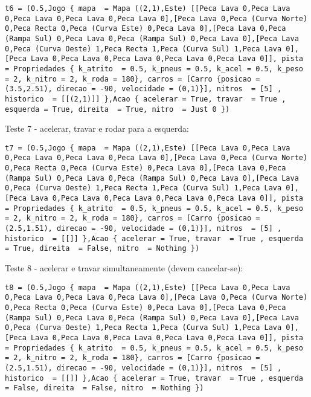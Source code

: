 \documentclass[a4paper]{report}
\begin{document}
\begin{lstlisting}
t6 = (0.5,Jogo { mapa  = Mapa ((2,1),Este) [[Peca Lava 0,Peca Lava 0,Peca Lava 0,Peca Lava 0,Peca Lava 0],[Peca Lava 0,Peca (Curva Norte) 0,Peca Recta 0,Peca (Curva Este) 0,Peca Lava 0],[Peca Lava 0,Peca (Rampa Sul) 0,Peca Lava 0,Peca (Rampa Sul) 0,Peca Lava 0],[Peca Lava 0,Peca (Curva Oeste) 1,Peca Recta 1,Peca (Curva Sul) 1,Peca Lava 0],[Peca Lava 0,Peca Lava 0,Peca Lava 0,Peca Lava 0,Peca Lava 0]], pista = Propriedades { k_atrito  = 0.5, k_pneus = 0.5, k_acel = 0.5, k_peso = 2, k_nitro = 2, k_roda = 180}, carros = [Carro {posicao = (3.5,2.51), direcao = -90, velocidade = (0,1)}], nitros  = [5] , historico  = [[(2,1)]] },Acao { acelerar = True, travar  = True , esquerda = True, direita  = True, nitro  = Just 0 })
\end{lstlisting}

Teste 7 - acelerar, travar e rodar para a esquerda:

\begin{lstlisting}
t7 = (0.5,Jogo { mapa  = Mapa ((2,1),Este) [[Peca Lava 0,Peca Lava 0,Peca Lava 0,Peca Lava 0,Peca Lava 0],[Peca Lava 0,Peca (Curva Norte) 0,Peca Recta 0,Peca (Curva Este) 0,Peca Lava 0],[Peca Lava 0,Peca (Rampa Sul) 0,Peca Lava 0,Peca (Rampa Sul) 0,Peca Lava 0],[Peca Lava 0,Peca (Curva Oeste) 1,Peca Recta 1,Peca (Curva Sul) 1,Peca Lava 0],[Peca Lava 0,Peca Lava 0,Peca Lava 0,Peca Lava 0,Peca Lava 0]], pista = Propriedades { k_atrito  = 0.5, k_pneus = 0.5, k_acel = 0.5, k_peso = 2, k_nitro = 2, k_roda = 180}, carros = [Carro {posicao = (2.5,1.51), direcao = -90, velocidade = (0,1)}], nitros  = [5] , historico  = [[]] },Acao { acelerar = True, travar  = True , esquerda = True, direita  = False, nitro  = Nothing })
\end{lstlisting}

Teste 8 - acelerar e travar simultaneamente (devem cancelar-se):

\begin{lstlisting}
t8 = (0.5,Jogo { mapa  = Mapa ((2,1),Este) [[Peca Lava 0,Peca Lava 0,Peca Lava 0,Peca Lava 0,Peca Lava 0],[Peca Lava 0,Peca (Curva Norte) 0,Peca Recta 0,Peca (Curva Este) 0,Peca Lava 0],[Peca Lava 0,Peca (Rampa Sul) 0,Peca Lava 0,Peca (Rampa Sul) 0,Peca Lava 0],[Peca Lava 0,Peca (Curva Oeste) 1,Peca Recta 1,Peca (Curva Sul) 1,Peca Lava 0],[Peca Lava 0,Peca Lava 0,Peca Lava 0,Peca Lava 0,Peca Lava 0]], pista = Propriedades { k_atrito  = 0.5, k_pneus = 0.5, k_acel = 0.5, k_peso = 2, k_nitro = 2, k_roda = 180}, carros = [Carro {posicao = (2.5,1.51), direcao = -90, velocidade = (0,1)}], nitros  = [5] , historico  = [[]] },Acao { acelerar = True, travar  = True , esquerda = False, direita  = False, nitro  = Nothing })
\end{lstlisting}
\end{document}
